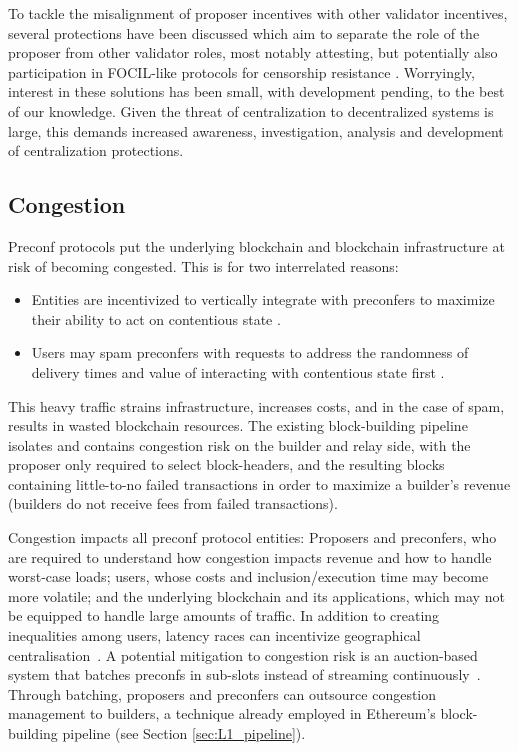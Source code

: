 \documentclass[a4paper]{article}
\theoremstyle{boldstyle}
\begin{document}
    To tackle the misalignment of proposer incentives with other validator incentives, several protections have been discussed which aim to separate the role of the proposer from other validator roles, most notably attesting, but potentially also participation in FOCIL-like protocols for censorship resistance \cite{W:UnbundlingStaking:TowardsRainbowStaking, W:Three-TierStaking, W:AppointedExecutionProposers}. Worryingly, interest in these solutions has been small, with development pending, to the best of our knowledge. Given the threat of centralization to decentralized systems is large, this demands increased awareness, investigation, analysis and development of centralization protections.

    
\subsection{Congestion}
    Preconf protocols put the underlying blockchain and blockchain infrastructure at risk of becoming congested. This is for two interrelated reasons: 
        \begin{itemize}
            \item Entities are incentivized to vertically integrate with preconfers to maximize their ability to act on contentious state \cite{W:StrawmanningBasedPreconfirmations}.
            \item Users may spam preconfers with requests to address the randomness of delivery times and value of interacting with contentious state first \cite{W:StrawmanningBasedPreconfirmations,W:BasedPreconfirmationswithMulti-roundMEV-Boost}.
        \end{itemize}
        
    This heavy traffic strains infrastructure, increases costs, and in the case of spam, results in wasted blockchain resources. 
    The existing block-building pipeline isolates and contains congestion risk on the builder and relay side, with the proposer only required to select block-headers, and the resulting blocks containing little-to-no failed transactions in order to maximize a builder's revenue (builders do not receive fees from failed transactions).
    
    Congestion impacts all preconf protocol entities: Proposers and preconfers, who are required to understand how congestion impacts revenue and how to handle worst-case loads; users, whose costs and inclusion/execution time may become more volatile; and the underlying blockchain and its applications, which may not be equipped to handle large amounts of traffic. In addition to creating inequalities among users, latency races can incentivize geographical centralisation~\cite{W:StrawmanningBasedPreconfirmations}.  A potential mitigation to congestion risk is an auction-based system that batches preconfs in sub-slots instead of streaming continuously~\cite{W:BasedPreconfirmationswithMulti-roundMEV-Boost, W:AnalysingExpectedProposerRevenuefromPreconfirmations}. Through batching, proposers and preconfers can outsource congestion management to builders, a technique already employed in Ethereum's block-building pipeline (see Section \ref{sec:L1_pipeline}).
 
\end{document}
